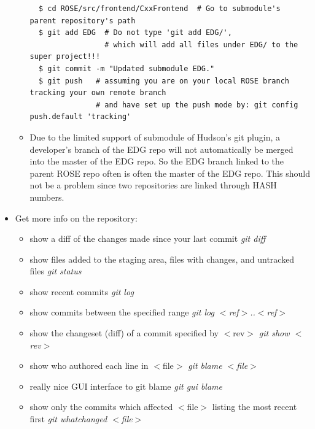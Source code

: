 \begin{itemize}
\begin{itemize}
  \begin{verbatim}
  $ cd ROSE/src/frontend/CxxFrontend  # Go to submodule's parent repository's path 
  $ git add EDG  # Do not type 'git add EDG/', 
                 # which will add all files under EDG/ to the super project!!!
  $ git commit -m "Updated submodule EDG."
  $ git push   # assuming you are on your local ROSE branch tracking your own remote branch 
               # and have set up the push mode by: git config push.default 'tracking'
  \end{verbatim}  
  \item Due to the limited support of submodule of Hudson's git plugin, a developer's branch
  of the EDG repo will not automatically be merged into the master of the EDG repo. So
  the EDG branch linked to the parent ROSE repo often is often the master of
  the EDG repo. This should not be a problem since two repositories are
  linked through HASH numbers. 
   
   \end{itemize}

\item Get more info on the repository:
   \begin{itemize}
          \item show a diff of the changes made since your last commit \textit{git diff}
	  \item show files added to the staging area, files with changes, and untracked files \textit{git status}
	  \item show recent commits \textit{git log}
	  \item show commits between the specified range \textit{git log $<$ref$>$..$<$ref$>$}
	  \item show the changeset (diff) of a commit specified by $<$rev$>$ \textit{git show $<$rev$>$}
	  \item show who authored each line in $<$file$>$ \textit{ git blame $<$file$>$ }
	  \item really nice GUI interface to git blame \textit{ git gui blame}
	  \item show only the commits which affected $<$file$>$ listing the most recent first \textit{git whatchanged $<$file$>$}
   \end{itemize}     


\end{itemize}

